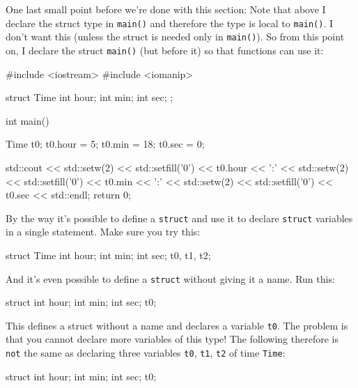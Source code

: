 \begin{center}
\begin{center}





One last small point before we're done with this
section: Note that above I declare the struct type in \texttt{main()} and
therefore the type is local to \texttt{main()}. I don't want this
(unless the struct is needed only in \texttt{main()}). So from this point
on, I declare the struct  \texttt{main()} (but before it)
so that  functions can use it:

\begin{consolethree}[escapeinside=||]
#include <iostream>
#include <iomanip>

struct Time
{
    int hour;
    int min;
    int sec;
};

int main()
{
    Time t0;
    t0.hour = 5;
    t0.min = 18;
    t0.sec = 0;

    std::cout << std::setw(2) << std::setfill('0')
              << t0.hour << ':'
              << std::setw(2) << std::setfill('0')
              << t0.min << ':'
              << std::setw(2) << std::setfill('0')
              << t0.sec
              << std::endl;
    return 0;
}
\end{consolethree}

By the way it's possible to define a \texttt{struct} and use it to declare \texttt{struct}
variables in a single statement. Make sure you try this:

\begin{consolethree}[escapeinside=||]
struct Time
{
    int hour;
    int min;
    int sec;
} t0, t1, t2;
\end{consolethree}

And it's even possible to define a \texttt{struct} without giving it a name. Run
this:

\begin{consolethree}[escapeinside=||]
struct
{
    int hour;
    int min;
    int sec;
} t0;
\end{consolethree}

This defines a struct without a name and declares a variable \texttt{t0}.
The problem is that you cannot declare more variables of this type! The
following therefore is \texttt{not} the same as declaring three variables
\texttt{t0}, \texttt{t1}, \texttt{t2} of time \texttt{Time}:

\begin{consolethree}[escapeinside=||]
struct
{
    int hour;
    int min;
    int sec;
} t0;


\end{consolethree}
\end{center}
\end{center}
